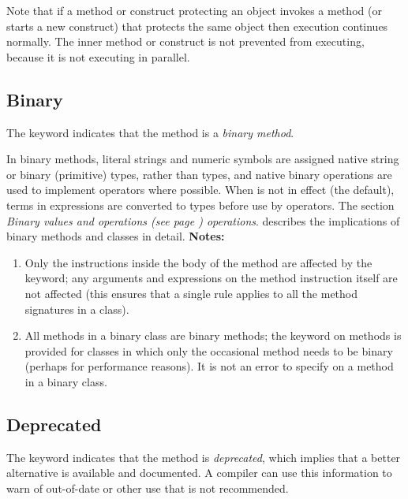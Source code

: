Note that if a method or construct protecting an object invokes a method
(or starts a new construct) that protects the same object then execution
continues normally.  The inner method or construct is not prevented from
executing, because it is not executing in parallel.
\subsection{Binary}\label{refbinme}
 
The keyword  indicates that the method is a \emph{binary
method}.
 
In binary methods, literal strings and numeric symbols are assigned
native string or binary (primitive) types, rather than \nr{} types,
and native binary operations are used to implement operators where
possible.
When  is not in effect (the default), terms in
expressions are converted to \nr{} types before use by operators.
The section  \emph{Binary values and operations (see page \pageref{refbinary}) 
operations}. describes the implications of binary methods and
classes in detail.
 \textbf{Notes:}
\begin{enumerate}
\item 
Only the instructions inside the body of the method are affected by the
 keyword; any arguments and expressions on the method
instruction itself are not affected (this ensures that a single rule
applies to all the method signatures in a class).
\item 
All methods in a binary class are binary methods; the 
keyword on methods is provided for classes in which only the occasional
method needs to be binary (perhaps for performance reasons).
It is not an error to specify  on a method in a binary
class.
\end{enumerate}
\subsection{Deprecated}\label{refdepme}
 
The keyword  indicates that the method
is \emph{deprecated}, which implies that a better alternative is
available and documented.  A compiler can use this information to warn
of out-of-date or other use that is not recommended.
 
